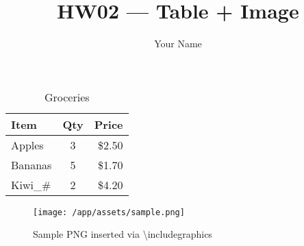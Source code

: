 \documentclass{article}
\title{HW02 — Table + Image}
\author{Your Name}
\begin{document}
\maketitle
\begin{table}[htbp]
\centering
\begin{tabular}{lcr}
Item & Qty & Price \\ \hline
Apples & 3 & \$2.50 \\
Bananas & 5 & \$1.70 \\
Kiwi\_\# & 2 & \$4.20 \\
\end{tabular}
\caption{Groceries}
\label{tab:grocery}
\end{table}

\begin{figure}[htbp]
\centering
\texttt{[image: /app/assets/sample.png]}
\caption{Sample PNG inserted via \textbackslash{}includegraphics}
\label{fig:sample}
\end{figure}
\end{document}
